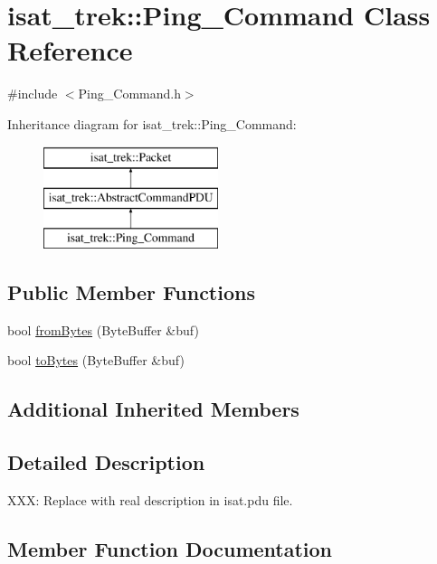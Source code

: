 \hypertarget{classisat__trek_1_1_ping___command}{}\section{isat\+\_\+trek\+:\+:Ping\+\_\+\+Command Class Reference}
\label{classisat__trek_1_1_ping___command}


{\ttfamily \#include $<$Ping\+\_\+\+Command.\+h$>$}

Inheritance diagram for isat\+\_\+trek\+:\+:Ping\+\_\+\+Command\+:\begin{figure}[H]
\begin{center}
\leavevmode
\includegraphics[height=3.000000cm]{classisat__trek_1_1_ping___command}
\end{center}
\end{figure}
\subsection*{Public Member Functions}
\begin{DoxyCompactItemize}
\item 
bool \hyperlink{classisat__trek_1_1_ping___command_afff4dc8927c1f4f729b2869b88e51cf8}{from\+Bytes} (Byte\+Buffer \&buf)
\item 
bool \hyperlink{classisat__trek_1_1_ping___command_a70eb1b308108360bcddef7263d99700e}{to\+Bytes} (Byte\+Buffer \&buf)
\end{DoxyCompactItemize}
\subsection*{Additional Inherited Members}


\subsection{Detailed Description}
X\+XX\+: Replace with real description in isat.\+pdu file. 

\subsection{Member Function Documentation}
